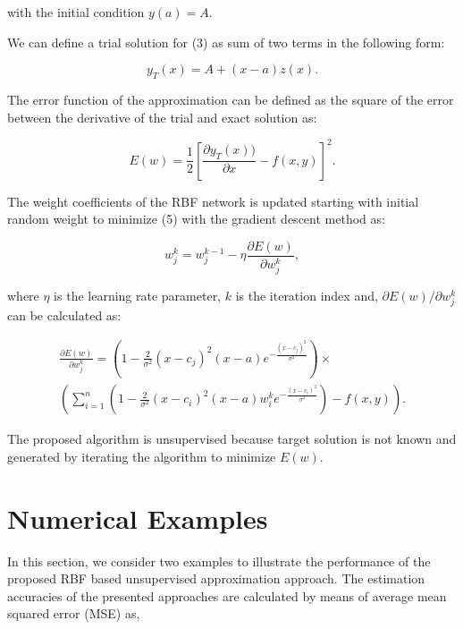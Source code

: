 \documentclass{mc}
\begin{document}
with the initial condition $y(a)=A$.

We can define a trial solution for (3) as sum of two terms in the following form:

\begin{equation}
y_T (x)=A+(x-a)z(x).
\end{equation}

The error function of the approximation can be defined as the square of the error between the derivative of the trial and exact solution as:

\begin{equation}
E(w)=\frac{1}{2}\left [ \frac{\partial y_T(x))}{\partial x}-f(x,y) \right ]^{2}.
\end{equation}

The weight coefficients of the RBF network is updated starting with initial random weight to minimize (5) with the gradient descent method as:

\begin{equation}
w_j^k=w_j^{k-1}-\eta \frac{\partial E(w)}{\partial w_j^k},
\end{equation}

where $\eta$ is the learning rate parameter, $k$ is the iteration index and, ${\partial E(w)}/{\partial w_j^k}$ can be calculated as:

\begin{equation}
\begin{split}
\frac{\partial E(w)}{\partial w_j^k}=\left ( 1-\frac{2}{\sigma ^{2}}(x-c_j)^{2}(x-a)e^{-\frac{(x-c_{j})^{2}}{\sigma^{2}}} \right)\times \\
\left ( \sum_{i=1}^{n}( 1-\frac{2}{\sigma ^{2}}(x-c_i)^{2}(x-a)w_i^ke^{-\frac{(x-c_{i})^{2}}{\sigma^{2}}})-f(x,y) \right ).
\end{split}
\end{equation}

The proposed algorithm is unsupervised because target solution is not known and generated by iterating the algorithm to minimize $E(w)$.


\section{Numerical Examples}

In this section, we consider two examples to illustrate the performance of the proposed RBF based unsupervised approximation approach. The estimation accuracies of the presented approaches are calculated by means of average mean squared error (MSE) as,
\end{document}
